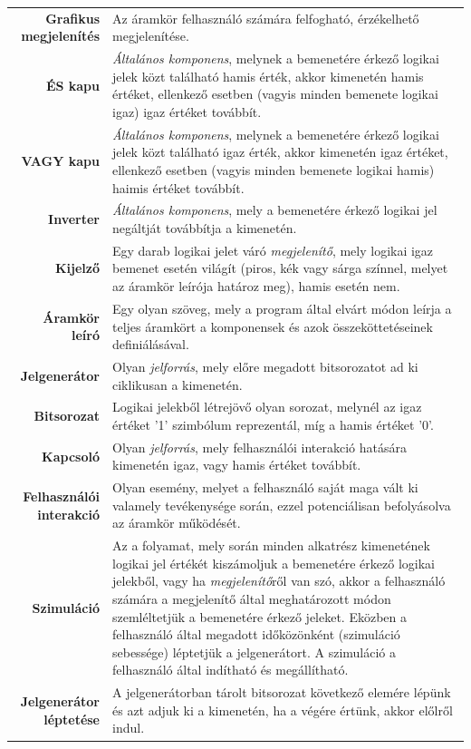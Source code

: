 \begin{longtable}{r p{10.95cm}}
\textbf{Grafikus megjelenítés} & Az áramkör felhasználó számára felfogható, érzékelhető megjelenítése.\\
\textbf{ÉS kapu} & \emph{Általános komponens}, melynek a bemenetére érkező logikai jelek közt található hamis érték, akkor kimenetén hamis értéket, ellenkező esetben (vagyis minden bemenete logikai igaz) igaz értéket továbbít. \\
\textbf{VAGY kapu} & \emph{Általános komponens}, melynek a bemenetére érkező logikai jelek közt található igaz érték, akkor kimenetén igaz értéket, ellenkező esetben (vagyis minden bemenete logikai hamis) haimis értéket továbbít. \\
\textbf{Inverter} & \emph{Általános komponens}, mely a bemenetére érkező logikai jel negáltját továbbítja a kimenetén. \\
\textbf{Kijelző} & Egy darab logikai jelet váró \emph{megjelenítő}, mely logikai igaz bemenet esetén világít (piros, kék vagy sárga színnel, melyet az áramkör leírója határoz meg), hamis esetén nem. \\
\textbf{Áramkör leíró} & Egy olyan szöveg, mely a program által elvárt módon leírja a teljes áramkört a komponensek és azok összeköttetéseinek definiálásával. \\
\textbf{Jelgenerátor} & Olyan \emph{jelforrás}, mely előre megadott bitsorozatot ad ki ciklikusan a kimenetén.\\
\textbf{Bitsorozat} & Logikai jelekből létrejövő olyan sorozat, melynél az igaz értéket ’1’ szimbólum reprezentál, míg a hamis értéket ’0’.\\
\textbf{Kapcsoló} & Olyan \emph{jelforrás}, mely felhasználói interakció hatására kimenetén igaz, vagy hamis értéket továbbít. \\
\textbf{Felhasználói interakció} & Olyan esemény, melyet a felhasználó saját maga vált ki valamely tevékenysége során, ezzel potenciálisan befolyásolva az áramkör működését. \\
\textbf{Szimuláció} & Az a folyamat, mely során minden alkatrész kimenetének logikai jel értékét kiszámoljuk a bemenetére érkező logikai jelekből, vagy ha \emph{megjelenítő}ről van szó, akkor a felhasználó számára a megjelenítő által meghatározott módon szemléltetjük a bemenetére érkező jeleket. Eközben a felhasználó által megadott időközönként (szimuláció sebessége) léptetjük a jelgenerátort. A szimuláció a felhasználó által indítható és megállítható.\\
\textbf{Jelgenerátor léptetése} & A jelgenerátorban tárolt bitsorozat következő elemére lépünk és azt adjuk ki a kimenetén, ha a végére értünk, akkor előlről indul.\\

\end{longtable}
